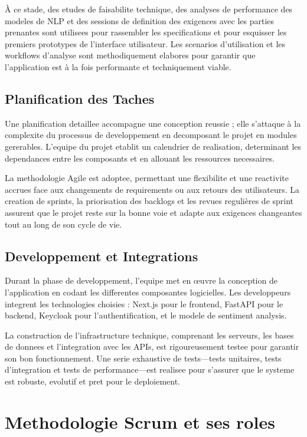 À ce stade, des etudes de faisabilite technique, des analyses de performance des modeles de NLP et des sessions de definition des exigences avec les parties prenantes sont utilisees pour rassembler les specifications et pour esquisser les premiers prototypes de l'interface utilisateur. Les scenarios d'utilisation et les workflows d'analyse sont methodiquement elabores pour garantir que l'application est à la fois performante et techniquement viable.

\subsection{Planification des Taches}

Une planification detaillee accompagne une conception reussie ; elle s'attaque à la complexite du processus de developpement en decomposant le projet en modules gererables. L'equipe du projet etablit un calendrier de realisation, determinant les dependances entre les composants et en allouant les ressources necessaires.

La methodologie Agile est adoptee, permettant une flexibilite et une reactivite accrues face aux changements de requirements ou aux retours des utilisateurs. La creation de sprints, la priorisation des backlogs et les revues regulières de sprint assurent que le projet reste sur la bonne voie et adapte aux exigences changeantes tout au long de son cycle de vie.

\subsection{Developpement et Integrations}

Durant la phase de developpement, l'equipe met en œuvre la conception de l'application en codant les differentes composantes logicielles. Les developpeurs integrent les technologies choisies : Next.js pour le frontend, FastAPI pour le backend, Keycloak pour l'authentification, et le modele de sentiment analysis.

La construction de l'infrastructure technique, comprenant les serveurs, les bases de donnees et l'integration avec les APIs, est rigoureusement testee pour garantir son bon fonctionnement. Une serie exhaustive de tests—tests unitaires, tests d'integration et tests de performance—est realisee pour s'assurer que le systeme est robuste, evolutif et pret pour le deploiement.

\section{Methodologie Scrum et ses roles}

